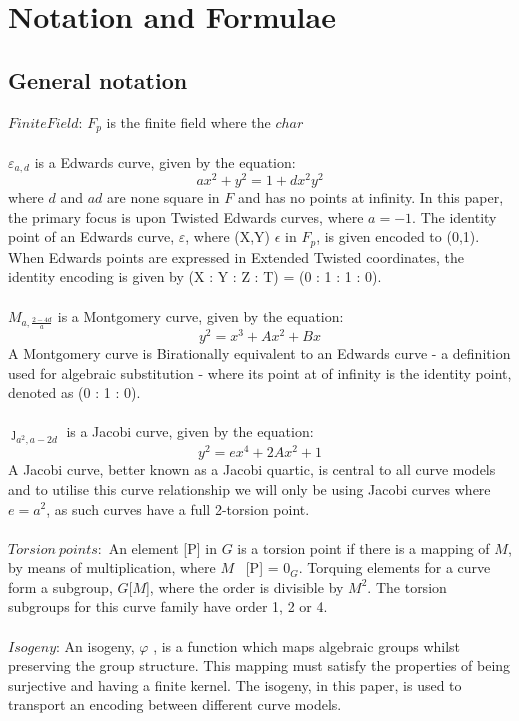 \documentclass{article}
\begin{document}
\section{Notation and Formulae} 
\subsection{General notation}
$Finite Field$: $F_p$ is the finite field where the $char$ \\\\
$\varepsilon_{a,d}$ is a Edwards curve, given by the equation: $$ {a}x^2+y^2=1+{d}x^2y^2 $$ where {$d$} and {$ad$} are none square in $F$ and has no points at infinity. In this paper, the primary focus is upon Twisted Edwards curves, where $a = -1$. The identity point of an Edwards curve, $\varepsilon$, where (X,Y) $\epsilon$ in $F_p$, is given encoded to (0,1). When Edwards points are expressed in Extended Twisted coordinates, the identity encoding is given by (X : Y : Z : T) = (0 : 1 : 1 : 0).\\\\
${M}_{a,\frac{2-4d}{a}}$ is a Montgomery curve, given by the equation: $$ y^2=x^3+Ax^2+Bx $$ A Montgomery curve is Birationally equivalent to an Edwards curve - a definition used for algebraic substitution -  where its point at of infinity is the identity point, denoted as (0 : 1 : 0).\\\\  
$\jmath_{a^{2},a−2d}$ is a Jacobi curve, given by the equation: $$y
^2 = {e}x^4 + 2Ax^2 + 1$$ A Jacobi curve, better known as a Jacobi quartic, is central to all curve models and to utilise this curve relationship we will only be using Jacobi curves where $e = {a}^2$, as such curves have a full 2-torsion point.\\\\
$Torsion\ points$:\ An element [P] in  $G$ is a torsion point if there is a mapping of $M$, by means of multiplication, where $M$ \textbullet\ [P] = $0_{G}$. Torquing elements for a curve form a subgroup, $G$[$M$], where the order is divisible by ${M}^2$. The torsion subgroups for this curve family have order 1, 2 or 4.  \\\\ 
$Isogeny$: An isogeny, $\varphi$ , is a function which maps algebraic groups whilst preserving the group structure. This mapping must satisfy the properties of being surjective and having a finite kernel. The isogeny, in this paper, is used to transport an encoding between different curve models.\\\\
\end{document}
